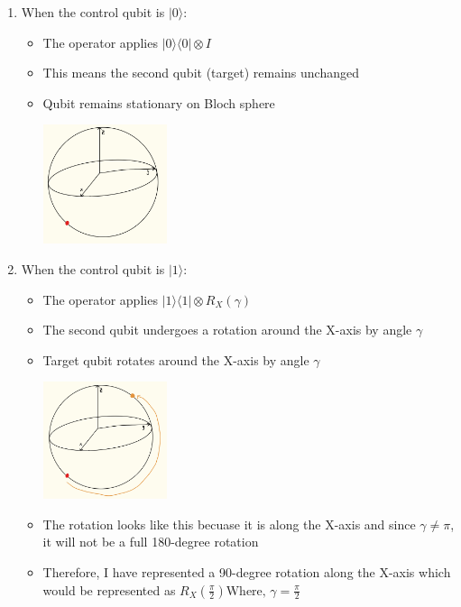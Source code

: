 \documentclass[12pt]{article}
\begin{document}
\begin{enumerate}
    \item When the control qubit is $|0\rangle$:
    \begin{itemize}
        \item The operator applies $|0\rangle \langle 0| \otimes I$
        \item This means the second qubit (target) remains unchanged
        \item Qubit remains stationary on Bloch sphere
        \begin{center}
            \includegraphics[width=0.3\textwidth]{case_one.jpeg}
        \end{center}
    \end{itemize}
    \item When the control qubit is $|1\rangle$:
    \begin{itemize}
        \item The operator applies $|1\rangle \langle 1| \otimes R_X (\gamma)$
        \item The second qubit undergoes a rotation around the X-axis by angle $\gamma$
        \item Target qubit rotates around the X-axis by angle $\gamma$
        \begin{center}
            \includegraphics[width=0.3\textwidth]{case_two.jpeg}
        \end{center}
        \item The rotation looks like this becuase it is along the X-axis and since $\gamma \neq \pi$, it will not be a full 180-degree rotation
        \item Therefore, I have represented a 90-degree rotation along the X-axis which would be represented as $R_X (\frac{\pi}{2}) \text{Where, } \gamma = \frac{\pi}{2}$
    \end{itemize}
\end{enumerate}

\end{document}
